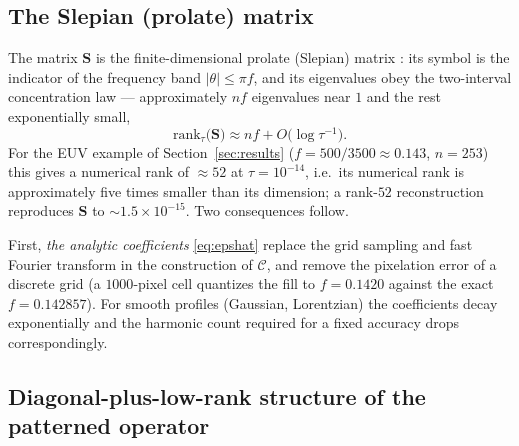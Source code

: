 \documentclass[11pt]{article}
\theoremstyle{remark}
\newcommand{\Cmat}{\mathcal{C}}
\begin{document}
\subsection{The Slepian (prolate) matrix}

The matrix $\mathbf{S}$ is the finite-dimensional prolate (Slepian) matrix
\cite{slepian1978discrete}: its symbol is the indicator of the frequency band
$|\theta|\le\pi f$, and its eigenvalues obey the two-interval concentration law
--- approximately $nf$ eigenvalues near $1$ and the rest exponentially small,
\begin{equation}
\mathrm{rank}_{\tau}\big(\mathbf{S}\big)\approx n f+O\big(\log\tau^{-1}\big).
\label{eq:rank}
\end{equation}
For the EUV example of Section~\ref{sec:results}
($f=500/3500\approx0.143$, $n=253$) this gives a numerical rank of $\approx52$
at $\tau=10^{-14}$, i.e.\ its numerical rank is approximately five times
smaller than its dimension; a rank-$52$ reconstruction reproduces
$\mathbf{S}$ to $\sim1.5\times10^{-15}$. Two
consequences follow.

First, \emph{the analytic coefficients} \eqref{eq:epshat} replace the grid
sampling and fast Fourier transform in the construction of $\Cmat$, and remove
the pixelation error of a discrete grid (a $1000$-pixel cell quantizes the fill
to $f=0.1420$ against the exact $f=0.142857$). For smooth profiles (Gaussian,
Lorentzian) the coefficients decay exponentially and the harmonic count
required for a fixed accuracy drops correspondingly.

\subsection{Diagonal-plus-low-rank structure of the patterned operator}
\label{sec:dplr}
\end{document}
